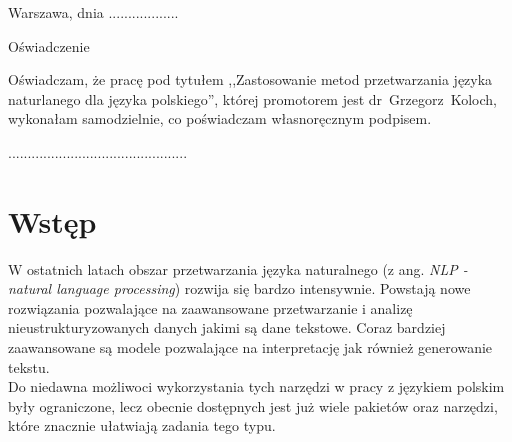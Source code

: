 \documentclass[a4paper,11pt,twoside]{report}
\theoremstyle{definition}
\newcommand{\tytul}{Zastosowanie metod przetwarzania języka naturlanego dla języka polskiego}
\newcommand{\supervisor}{dr~Grzegorz~Koloch}
\begin{document}
\null \hfill Warszawa, dnia ..................\\

\par\vspace{5cm}

\begin{center}
Oświadczenie
\end{center}

\indent Oświadczam, że pracę pod
tytułem ,,\tytul '', której promotorem jest \mbox{\supervisor}, wykonałam
samodzielnie, co poświadczam własnoręcznym podpisem.
\vspace{2cm}


\begin{flushright}
  \begin{minipage}{50mm}
    \begin{center}
      ..............................................

    \end{center}
  \end{minipage}
\end{flushright}

\thispagestyle{empty}
\newpage



\tableofcontents
\thispagestyle{empty}


\null\thispagestyle{empty}\newpage
\pagestyle{fancy}

\chapter{Wstęp}
W ostatnich latach obszar przetwarzania języka naturalnego (z ang. \textit{NLP - natural language processing}) rozwija się bardzo intensywnie. Powstają nowe rozwiązania pozwalające na zaawansowane przetwarzanie i analizę nieustrukturyzowanych danych jakimi są dane tekstowe. Coraz bardziej zaawansowane są modele pozwalające na interpretację jak również generowanie tekstu. \\
Do niedawna możliwoci wykorzystania tych narzędzi w pracy z językiem polskim były ograniczone, lecz obecnie dostępnych jest już wiele pakietów oraz narzędzi, które znacznie ułatwiają zadania tego typu.
\end{document}
